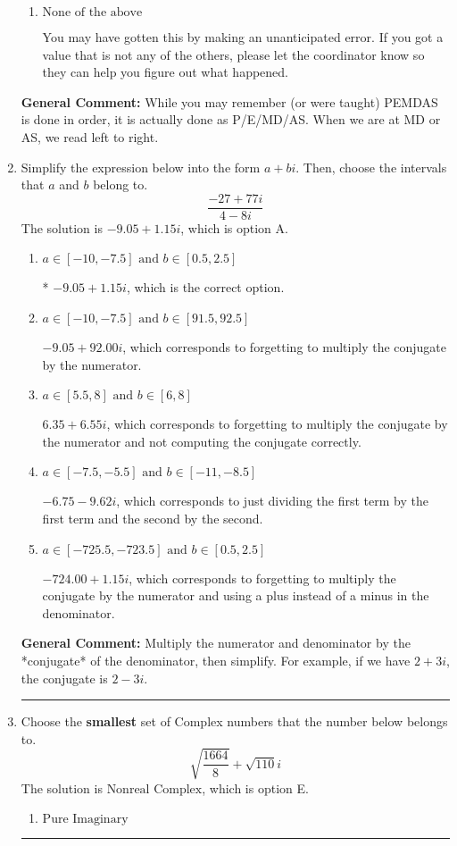 \documentclass{extbook}[14pt]
\newcommand{\litem}[1]{\item #1

\rule{\textwidth}{0.4pt}}
\begin{document}
\begin{enumerate}
{\begin{enumerate}[label=\Alph*.]
* -7.333, this is the correct option
\item \( \text{None of the above} \)

 You may have gotten this by making an unanticipated error. If you got a value that is not any of the others, please let the coordinator know so they can help you figure out what happened.
\end{enumerate}

\textbf{General Comment:} While you may remember (or were taught) PEMDAS is done in order, it is actually done as P/E/MD/AS. When we are at MD or AS, we read left to right.
}
\litem{
Simplify the expression below into the form $a+bi$. Then, choose the intervals that $a$ and $b$ belong to.
\[ \frac{-27 + 77 i}{4 - 8 i} \]
The solution is \( -9.05  + 1.15 i \), which is option A.\begin{enumerate}[label=\Alph*.]
\item \( a \in [-10, -7.5] \text{ and } b \in [0.5, 2.5] \)

* $-9.05  + 1.15 i$, which is the correct option.
\item \( a \in [-10, -7.5] \text{ and } b \in [91.5, 92.5] \)

 $-9.05  + 92.00 i$, which corresponds to forgetting to multiply the conjugate by the numerator.
\item \( a \in [5.5, 8] \text{ and } b \in [6, 8] \)

 $6.35  + 6.55 i$, which corresponds to forgetting to multiply the conjugate by the numerator and not computing the conjugate correctly.
\item \( a \in [-7.5, -5.5] \text{ and } b \in [-11, -8.5] \)

 $-6.75  - 9.62 i$, which corresponds to just dividing the first term by the first term and the second by the second.
\item \( a \in [-725.5, -723.5] \text{ and } b \in [0.5, 2.5] \)

 $-724.00  + 1.15 i$, which corresponds to forgetting to multiply the conjugate by the numerator and using a plus instead of a minus in the denominator.
\end{enumerate}

\textbf{General Comment:} Multiply the numerator and denominator by the *conjugate* of the denominator, then simplify. For example, if we have $2+3i$, the conjugate is $2-3i$.
}
\litem{
Choose the \textbf{smallest} set of Complex numbers that the number below belongs to.
\[ \sqrt{\frac{1664}{8}}+\sqrt{110} i \]
The solution is \( \text{Nonreal Complex} \), which is option E.\begin{enumerate}[label=\Alph*.]
\item \( \text{Pure Imaginary} \)


\end{enumerate}}
\end{enumerate}
\end{document}
